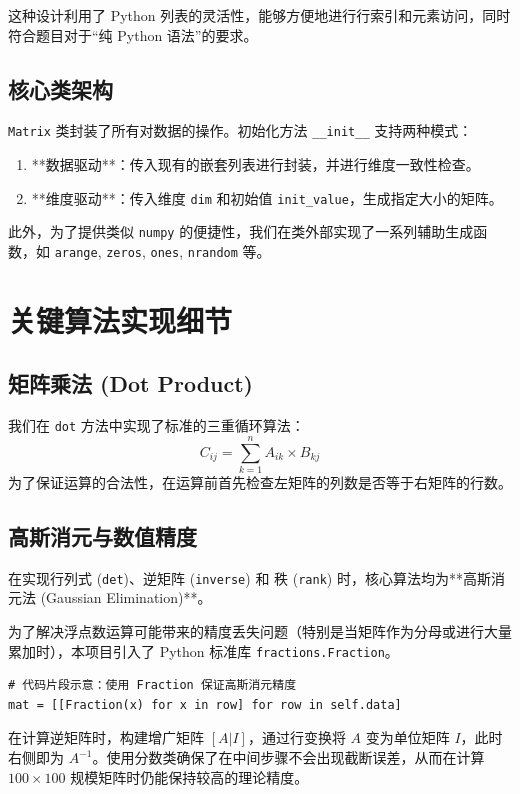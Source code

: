 \documentclass[a4paper,12pt]{ctexart}
\begin{document}
这种设计利用了 Python 列表的灵活性，能够方便地进行行索引和元素访问，同时符合题目对于“纯 Python 语法”的要求。

\subsection{核心类架构}
\texttt{Matrix} 类封装了所有对数据的操作。初始化方法 \texttt{\_\_init\_\_} 支持两种模式：
\begin{enumerate}
    \item **数据驱动**：传入现有的嵌套列表进行封装，并进行维度一致性检查。
    \item **维度驱动**：传入维度 \texttt{dim} 和初始值 \texttt{init\_value}，生成指定大小的矩阵。
\end{enumerate}

此外，为了提供类似 \texttt{numpy} 的便捷性，我们在类外部实现了一系列辅助生成函数，如 \texttt{arange}, \texttt{zeros}, \texttt{ones}, \texttt{nrandom} 等。

\section{关键算法实现细节}

\subsection{矩阵乘法 (Dot Product)}
我们在 \texttt{dot} 方法中实现了标准的三重循环算法：
\[ C_{ij} = \sum_{k=1}^{n} A_{ik} \times B_{kj} \]
为了保证运算的合法性，在运算前首先检查左矩阵的列数是否等于右矩阵的行数。

\subsection{高斯消元与数值精度}
在实现行列式 (\texttt{det})、逆矩阵 (\texttt{inverse}) 和 秩 (\texttt{rank}) 时，核心算法均为**高斯消元法 (Gaussian Elimination)**。

为了解决浮点数运算可能带来的精度丢失问题（特别是当矩阵作为分母或进行大量累加时），本项目引入了 Python 标准库 \texttt{fractions.Fraction}。
\begin{lstlisting}
# 代码片段示意：使用 Fraction 保证高斯消元精度
mat = [[Fraction(x) for x in row] for row in self.data]
\end{lstlisting}
在计算逆矩阵时，构建增广矩阵 $[A | I]$，通过行变换将 $A$ 变为单位矩阵 $I$，此时右侧即为 $A^{-1}$。使用分数类确保了在中间步骤不会出现截断误差，从而在计算 $100 \times 100$ 规模矩阵时仍能保持较高的理论精度。
\end{document}
